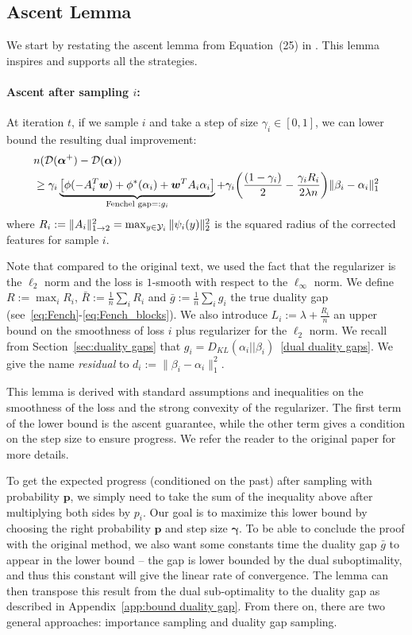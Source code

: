 \subsection{Ascent Lemma}\label{ascent lemma}
We start by restating the ascent lemma from Equation~(25) in \citet{shalev-shwartz_accelerated_2013-1}.
This lemma inspires and supports all the strategies.

\paragraph{Ascent after sampling $i$:}
At iteration $t$, if we sample $i$ and take a step of size  $\gamma_i \in [0,1]$, we can lower bound the resulting dual improvement:
\begin{align}
	\label{one point descent}
	& n ({\mathcal D}(\boldsymbol{\alpha}^+) - {\mathcal D}(\boldsymbol{\alpha})) \notag \\
	& \geq \gamma_i \underbrace{ \big [ \phi(-A_i^T \boldsymbol{w}) + \phi^*(\alpha_i) + \boldsymbol{w}^T A_i \alpha_i \big ] }
	_{ \textrm{Fenchel gap} =: g_i}
	+ \gamma_i \bigg ( \frac{(1-\gamma_i)}{2} - \frac{\gamma_i R_i}{2 \lambda n} \bigg )\| \beta_i - \alpha_i \|^2_1
\end{align}
where  $R_i := \|A_i\|^2_{1\rightarrow 2}  = \max_{y\in{\mathcal Y}_i} \| \psi_i(y) \|_2^2 $ is the squared radius of the corrected features for sample $i$.

Note that compared to the original text, we used the fact that the regularizer is the $\ell_2$ norm and the loss is $1$-smooth with respect to the $\ell_\infty$ norm.
We define $R:=\max_i R_i$, ${\bar R := \frac{1}{n} \sum_i R_i}$ and $\bar g := \frac{1}{n} \sum_i g_i$ the true duality gap (see~\eqref{eq:Fench}-\eqref{eq:Fench_blocks}).
We also introduce $L_i := \lambda + \frac{R_i}{n}$ an upper bound on the smoothness of loss $i$ plus regularizer for the $\ell_2$ norm.
We recall from Section~\ref{sec:duality gaps} that $g_i = D_{KL}(\alpha_i || \beta_i)$~\eqref{dual duality gaps}.
We give the name \textit{residual} to $d_i := \| \beta_i - \alpha_i \|^2_1$.

This lemma is derived with standard assumptions and inequalities on the smoothness of the loss and the strong convexity of the regularizer.
The first term of the lower bound is the ascent guarantee, while the other term gives a condition on the step size to ensure progress.
We refer the reader to the original paper for more details.

To get the expected progress (conditioned on the past) after sampling with probability $\bm p$, we simply need to take the sum of the inequality above after multiplying both sides by $p_i$.
Our goal is to maximize this lower bound by choosing the right probability $\bm p$ and step size $\bm \gamma$.
To be able to conclude the proof with the original method, we also want some constants time the duality gap $\bar g$ to appear in the lower bound -- the gap is lower bounded by the dual suboptimality, and thus this constant will give the linear rate of convergence.
The lemma can then transpose this result from the dual sub-optimality to the duality gap as described in Appendix~\ref{app:bound duality gap}.
From there on, there are two general approaches: importance sampling and duality gap sampling.

